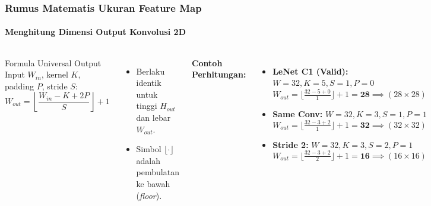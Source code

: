 \documentclass[t,aspectratio=169,xcolor=dvipsnames]{beamer}
\begin{document}
\begin{frame}
    \frametitle{Rumus Matematis Ukuran Feature Map}
    \framesubtitle{Menghitung Dimensi Output Konvolusi 2D}
    \footnotesize

    \begin{columns}[t]
        \begin{exampleblock}{Formula Universal Output}
            Input $W_{in}$, kernel $K$, padding $P$, stride $S$:
            $$W_{out} = \left\lfloor \frac{W_{in} - K + 2P}{S} \right\rfloor + 1$$
        \end{exampleblock}
        \begin{itemize}
            \item Berlaku identik untuk tinggi $H_{out}$ dan lebar $W_{out}$.
            \item Simbol $\lfloor \cdot \rfloor$ adalah pembulatan ke bawah (\textit{floor}).
        \end{itemize}

        \textbf{Contoh Perhitungan:}
        \begin{itemize}
            \item \textbf{LeNet C1 (Valid):} $W=32, K=5, S=1, P=0$
            $$W_{out} = \lfloor \tfrac{32 - 5 + 0}{1} \rfloor + 1 = \mathbf{28} \implies (28 \times 28)$$
            \item \textbf{Same Conv:} $W=32, K=3, S=1, P=1$
            $$W_{out} = \lfloor \tfrac{32 - 3 + 2}{1} \rfloor + 1 = \mathbf{32} \implies (32 \times 32)$$
            \item \textbf{Stride 2:} $W=32, K=3, S=2, P=1$
            $$W_{out} = \lfloor \tfrac{32 - 3 + 2}{2} \rfloor + 1 = \mathbf{16} \implies (16 \times 16)$$
        \end{itemize}
    \end{columns}
\end{frame}
\end{document}
